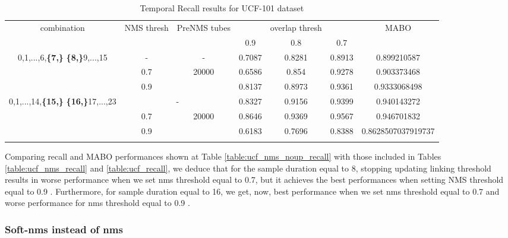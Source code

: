 \begin{center}
  \setlength{\tabcolsep}{2.2pt}
\begin{longtable}{||c | c | c | c c c| c|}

  \hline
  \multirow{2}{*}{combination} & \multirow{2}{2.5em}{NMS thresh} & \multirow{2}{3.5em}{PreNMS tubes} &  {} &overlap thresh & {} & \multirow{2}{*}{MABO} \\
  {} & {} & {} &  0.9 &  0.8 & 0.7 & {}\\         
  \hline

  \multirow{3}{7em}{0,1,...,6,\textbf{\{7,\}}
    \textbf{\{8,\}}9,...,15 }  &   -   & -    & 0.7087 & 0.8281 & 0.8913 & 0.899210587 \\
  \cline{2-7} 
  {} & 0.7 &\multirow{2}{*}{20000}  & 0.6586 & 0.854 & 0.9278 & 0.903373468 \\
  \cline{2-2} \cline{4-7} 
  {} &  0.9   & {}   &  0.8137 & 0.8973 & 0.9361 & 0.9333068498 \\
  \hline                                    
  \multirow{3}{7em}{0,1,...,14,\textbf{\{15,\}}
  \textbf{\{16,\}}17,...,23 }  &   \multicolumn{2}{|c|}{-} & 0.8327 & 0.9156 &0.9399 & 0.940143272 \\
  \cline{2-7}
  {} & 0.7 & \multirow{2}{*}{20000}& 0.8646 & 0.9369 & 0.9567 & 0.946701832 \\
  \cline{2-2} \cline{4-7} 
  {} &  0.9   & {}   & 0.6183 & 0.7696 & 0.8388 & 0.8628507037919737 \\
  \hline                                    

  \caption{Temporal Recall results for UCF-101 dataset}
  \label{table:ucf_nms_noup_temp_recall}
\end{longtable} 
\end{center}

Comparing recall and MABO performances shown at Table \ref{table:ucf_nms_noup_recall} with those included in Tables \ref{table:ucf_nms_recall}
and \ref{table:ucf_recall}, we deduce that for the sample duration equal to 8, stopping updating linking threshold results in worse performance
when we set nms threshold equal to 0.7, but it achieves the best performances  when setting NMS threshold equal to 0.9 . Furthermore, for sample duration
equal to 16, we get, now,  best performance when we set nms threshold equal to 0.7 and worse performance for nms threshold equal to 0.9 .

\subsubsection{Soft-nms instead of nms}

